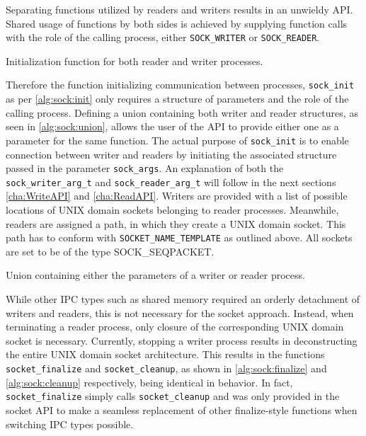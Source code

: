 Separating functions utilized by readers and writers results in an unwieldy \ac{API}.
Shared usage of functions by both sides is achieved by supplying function calls with the role of the calling process, either \texttt{SOCK\_WRITER} or \texttt{SOCK\_READER}.

\begin{algorithm}[h!]
    
    \caption[Socket: Socket initialization]{Initialization function for both reader and writer processes.}
    \label{alg:sock:init}
\end{algorithm}

Therefore the function initializing communication between processes, \texttt{sock\_init} as per \ref{alg:sock:init} only requires a structure of parameters and the role of the calling process.
Defining a union containing both writer and reader structures, as seen in \ref{alg:sock:union}, allows the user of the \ac{API} to provide either one as a parameter for the same function.
The actual purpose of \texttt{sock\_init} is to enable connection between writer and readers by initiating the associated structure passed in the parameter \texttt{sock\_args}.
An explanation of both the \texttt{sock\_writer\_arg\_t} and \texttt{sock\_reader\_arg\_t} will follow in the next sections \ref{cha:WriteAPI} and \ref{cha:ReadAPI}.
Writers are provided with a list of possible locations of UNIX domain sockets belonging to reader processes.
Meanwhile, readers are assigned a path, in which they create a UNIX domain socket.
This path has to conform with \texttt{SOCKET\_NAME\_TEMPLATE} as outlined above.
All sockets are set to be of the type SOCK\_SEQPACKET.

\begin{algorithm}[h!]
    
    \caption[Socket: Union for flexible function calling]{Union containing either the parameters of a writer or reader process.}
    \label{alg:sock:union}
\end{algorithm}

While other \ac{IPC} types such as shared memory required an orderly detachment of writers and readers, this is not necessary for the socket approach.
Instead, when terminating a reader process, only closure of the corresponding UNIX domain socket is necessary.
Currently, stopping a writer process results in deconstructing the entire UNIX domain socket architecture.
This results in the functions \texttt{socket\_finalize} and \texttt{socket\_cleanup}, as shown in \ref{alg:sock:finalize} and \ref{alg:sock:cleanup} respectively, being identical in behavior.
In fact, \texttt{socket\_finalize} simply calls \texttt{socket\_cleanup} and was only provided in the socket \ac{API} to make a seamless replacement of other finalize-style functions when switching \ac{IPC} types possible.

